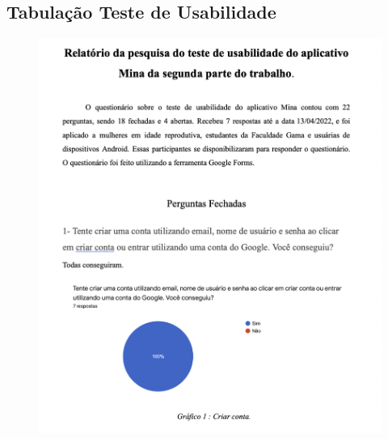 \begin{apendicesenv}
    \chapter{Tabulação Teste de Usabilidade}
    \label{usertest}
    \begin{figure}[ht]
        \centering
        \includegraphics[keepaspectratio=true,scale=0.7]{figuras/ap1.png}
    \end{figure}


\end{apendicesenv}
